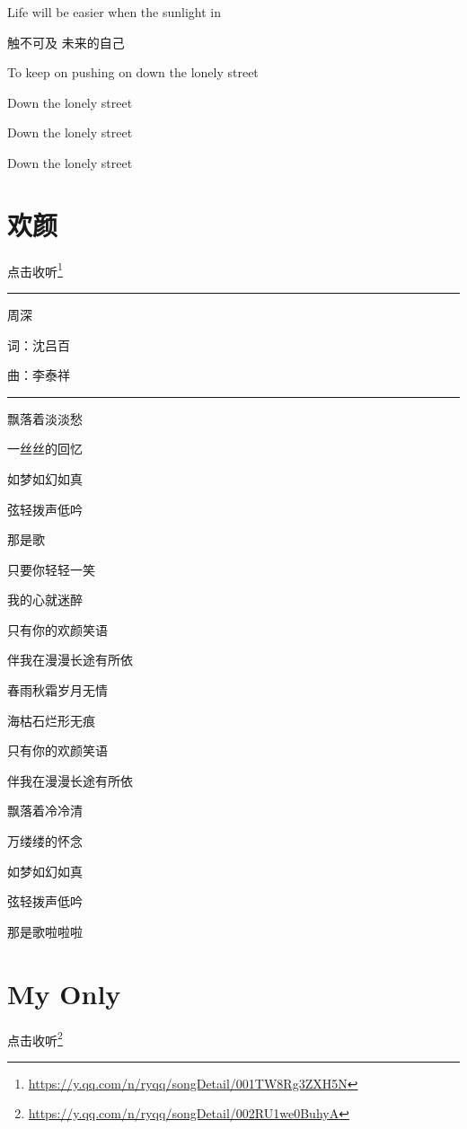 \documentclass[]{ctexbook}
\renewcommand{\href}[2]{#2\footnote{\url{#1}}}
\begin{document}
Life will be easier when the sunlight in

触不可及 未来的自己

To keep on pushing on down the lonely street

Down the lonely street

Down the lonely street

Down the lonely street

\section*{欢颜}\label{happy-face}


\href{https://y.qq.com/n/ryqq/songDetail/001TW8Rg3ZXH5N}{点击收听}

\begin{center}\rule{0.5\linewidth}{0.5pt}\end{center}

周深

词：沈吕百

曲：李泰祥

\begin{center}\rule{0.5\linewidth}{0.5pt}\end{center}

飘落着淡淡愁

一丝丝的回忆

如梦如幻如真

弦轻拨声低吟

那是歌

只要你轻轻一笑

我的心就迷醉

只有你的欢颜笑语

伴我在漫漫长途有所依

春雨秋霜岁月无情

海枯石烂形无痕

只有你的欢颜笑语

伴我在漫漫长途有所依

飘落着冷冷清

万缕缕的怀念

如梦如幻如真

弦轻拨声低吟

那是歌啦啦啦

\section*{My Only}\label{my-only}


\href{https://y.qq.com/n/ryqq/songDetail/002RU1we0BuhyA}{点击收听}
\end{document}
